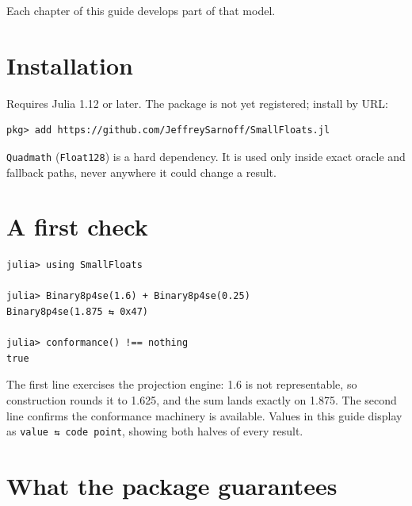 Each chapter of this guide develops part of that model.



\section{Installation}



\label{16848947351613073531}{}


Requires Julia 1.12 or later. The package is not yet registered; install by URL:




\begin{verbatim}
pkg> add https://github.com/JeffreySarnoff/SmallFloats.jl
\end{verbatim}



\texttt{Quadmath} (\texttt{Float128}) is a hard dependency. It is used only inside exact oracle and fallback paths, never anywhere it could change a result.



\section{A first check}



\label{9269468680705793367}{}



\begin{verbatim}
julia> using SmallFloats

julia> Binary8p4se(1.6) + Binary8p4se(0.25)
Binary8p4se(1.875 ⇆ 0x47)

julia> conformance() !== nothing
true
\end{verbatim}



The first line exercises the projection engine: 1.6 is not representable, so construction rounds it to 1.625, and the sum lands exactly on 1.875. The second line confirms the conformance machinery is available. Values in this guide display as \texttt{value ⇆ code point}, showing both halves of every result.



\section{What the package guarantees}



